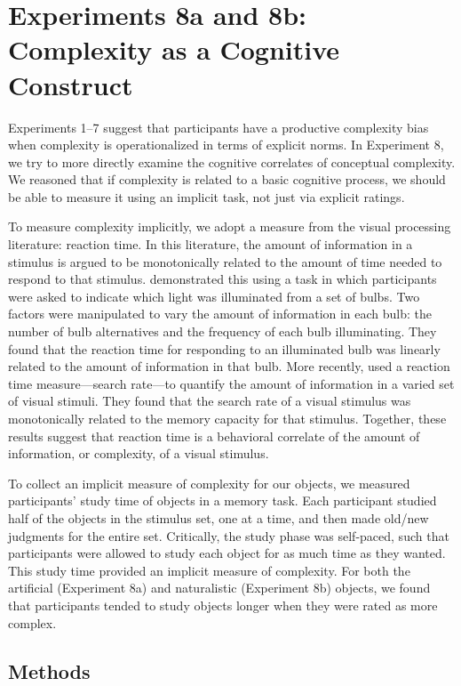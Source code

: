 \documentclass[man]{apa2}
\begin{document}
\section{Experiments 8a and 8b: Complexity as a Cognitive Construct}
Experiments 1--7 suggest that participants have a productive complexity bias when complexity is operationalized in terms of explicit norms. In Experiment 8, we try to more directly examine the cognitive correlates of conceptual complexity. We reasoned that if complexity is related to a basic cognitive process, we should be able to measure it using an implicit task, not just via explicit ratings. 

To measure complexity implicitly, we adopt a measure from the visual processing literature: reaction time. In this literature, the amount of information in a stimulus is argued to be monotonically related to the amount of time needed to respond to that stimulus.  demonstrated this using a task in which participants were asked to indicate which light was illuminated from a set of bulbs. Two factors were manipulated to vary the amount of information in each bulb: the number of bulb alternatives and the frequency of each bulb illuminating. They found that the reaction time for responding to an illuminated bulb was linearly related to the amount of information in that bulb. More recently,  used a reaction time measure---search rate---to quantify the amount of information in a varied set of visual stimuli. They found that the search rate of a visual stimulus was monotonically related to the memory capacity for that stimulus. Together, these results suggest that reaction time is a behavioral correlate of the amount of information, or complexity, of a visual stimulus.

To collect an implicit measure of complexity for our objects, we measured participants' study time of objects in a memory task. Each participant studied half of the objects in the stimulus set, one at a time, and then made old/new judgments for the entire set. Critically, the study phase was self-paced, such that participants were allowed to study each object for as much time as they wanted. This study time provided an implicit measure of complexity. For both the artificial (Experiment 8a) and naturalistic (Experiment 8b) objects, we found that participants tended to study objects longer when they were rated as more complex.

\subsection{Methods}
\end{document}
